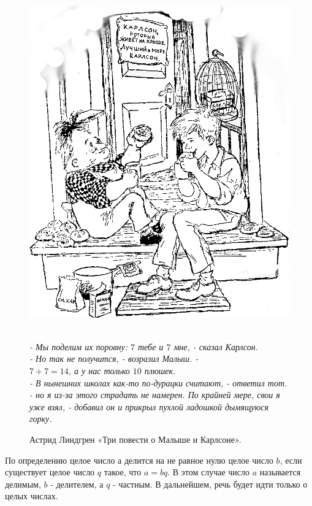 
\begin{figure}[!h]
\begin{minipage}{0.4\linewidth}~\hfill
\includegraphics[scale=0.17]{./img/karlson}\hfill~
\end{minipage}
\begin{minipage}{0.55\linewidth}
\epigraph{
\textit{- Мы поделим их поровну: $7$ тебе и $7$ мне, - сказал Карлсон.\\
- Но так не получится, - возразил Малыш. -\\  $7+7=14$, а у нас только $10$ плюшек.\\
- В нынешних школах как-то по-дурацки считают, - ответил тот. - но я из-за этого страдать не намерен. По крайней мере, свои я уже взял, - добавил он и прикрыл пухлой ладошкой дымящуюся горку.
}}{Астрид Линдгрен «Три повести о Малыше и Карлсоне».}
\end{minipage}
\end{figure}

По определению целое число $а$ делится на не равное нулю целое число $b$, если существует целое число $q$ такое, что $a = bq$. В этом случае число $a$ называется делимым, $b$ - делителем, а $q$ - частным. В дальнейшем, речь будет идти только о целых числах.

